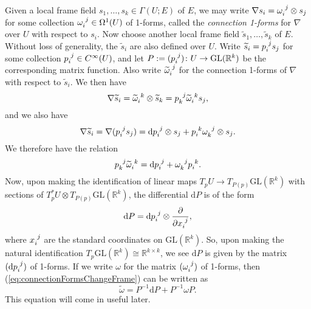 \documentclass{book}
\newcommand{\bbR}{\mathbb{R}}
\renewcommand{\d}{\mathrm{d}}
\newcommand{\GL}{\mathrm{GL}}
\newcommand{\pdv}[2]{\frac{\partial{#1}}{\partial{#2}}}
\theoremstyle{definition}
\numberwithin{equation}{section}
\begin{document}
Given a local frame field $s_1,\dots,s_k \in \Gamma(U;E)$ of $E$, we may write $\nabla s_i = \tensor{\omega}{_i^j} \otimes s_j$ for some collection $\tensor{\omega}{_i^j} \in \Omega^1(U)$ of 1-forms, called the \textit{connection 1-forms} for $\nabla$ over $U$ with respect to $s_i$. Now choose another local frame field $\widetilde{s}_1,\dots,\widetilde{s}_k$ of $E$. Without loss of generality, the $\widetilde{s}_i$ are also defined over $U$. Write $\widetilde{s}_i = \tensor{p}{_i^j} s_j$ for some collection $\tensor{p}{_i^j} \in C^\infty(U)$, and let $P := (\tensor{p}{_i^j}) \colon U \to \GL(\bbR^k)$ be the corresponding matrix function. Also write $\tensor{\widetilde{\omega}}{_i^j}$ for the connection 1-forms of $\nabla$ with respect to $\widetilde{s}_i$. We then have
\begin{equation}
    \nabla\widetilde{s}_i = \tensor{\widetilde{\omega}}{_i^k} \otimes \widetilde{s}_k = \tensor{p}{_k^j} \tensor{\widetilde{\omega}}{_i^k} s_j,
\end{equation}
and we also have 
\begin{equation}
    \nabla\widetilde{s}_i = \nabla(\tensor{p}{_i^j}s_j) = \d\tensor{p}{_i^j} \otimes s_j + \tensor{p}{_i^k} \tensor{\omega}{_k^j} \otimes s_j.
\end{equation}
We therefore have the relation
\begin{equation} \label{eq:connectionFormsChangeFrame}
    \tensor{p}{_k^j} \tensor{\widetilde{\omega}}{_i^k} = \d\tensor{p}{_i^j} + \tensor{\omega}{_k^j} \tensor{p}{_i^k}.
\end{equation}
Now, upon making the identification of linear maps $T_p U \to T_{P(p)} \GL(\bbR^k)$ with sections of $T_p^*U \otimes T_{P(p)}\GL(\bbR^k)$, the differential $\d P$ is of the form
\begin{equation}
    \d P = \d\tensor{p}{_i^j} \otimes \pdv{}{\tensor{x}{_i^j}},
\end{equation}
where $\tensor{x}{_i^j}$ are the standard coordinates on $\GL(\bbR^k)$. So, upon making the natural identification $T_p\GL(\bbR^k) \cong \bbR^{k \times k}$, we see $\d P$ is given by the matrix $(\d\tensor{p}{_i^j})$ of 1-forms. If we write $\omega$ for the matrix $(\tensor{\omega}{_i^j})$ of 1-forms, then (\ref{eq:connectionFormsChangeFrame}) can be written as 
\begin{equation}
    \widetilde{\omega} = P^{-1} \d P + P^{-1} \omega P.
\end{equation}
This equation will come in useful later.
\end{document}
